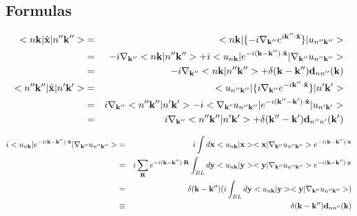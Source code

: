 \documentclass[aps,prb,preprint]{revtex4-1}
\begin{document}
\begin{appendix} \footnotesize
\section{Formulas}
%
\begin{eqnarray}
<n{\bf k}|\hat{\bf x}|n''{\bf k''}>&=& <n{\bf k}| \{ -i \nabla_{\bf k''} e^{i{\bf k'' \cdot \hat{x} }} \} |u_{n''{\bf k''}}>\nonumber \\
&=&  -i \nabla_{\bf k''} <n{\bf k}|n''{\bf k''}> + i <u_{n{\bf k}}| e^{-i{\bf (k-k'') \cdot \hat{x} }} |\nabla_{\bf k''} u_{n''{\bf k''}}>\nonumber \\
&=&  -i \nabla_{\bf k''} <n{\bf k}|n''{\bf k''}> + \delta({\bf k-k''}) {\bf d}_{nn''}({\bf k}) \\
<n''{\bf k''}|\hat{\bf x}|n'{\bf k'}>&=& <u_{n''{\bf k''}}| \{ i \nabla_{\bf k''} e^{-i{\bf k'' \cdot \hat{x} }} \} |n'{\bf k'}>\nonumber \\
&=&  i \nabla_{\bf k''} <n''{\bf k''}|n'{\bf k'}> - i <\nabla_{\bf k"} u_{n''{\bf k''}}| e^{-i{\bf (k''-k') \cdot \hat{x} }} |u_{n'{\bf k'}}>\nonumber \\
&=&  i \nabla_{\bf k''} <n''{\bf k''}|n'{\bf k'}> + \delta({\bf k''-k'}) {\bf d}_{n''n'}({\bf k'})
\end{eqnarray} 

%
\begin{eqnarray}
i <u_{n{\bf k}}| e^{-i{\bf (k-k'' )\cdot \hat{x}} }|\nabla_{\bf k''} u_{n''{\bf k''}}> &=& i \int d{\bf x} <u_{n{\bf k}}|{\bf x}> <{\bf x}|\nabla_{\bf k''} u_{n''{\bf k''}}> e^{-i{\bf (k-k'' )\cdot {x}} }\nonumber \\
&=& i \sum_{\bf R} e^{-i{\bf (k-k'' )\cdot {\bf R}} } \int_{BL} d{\bf y} <u_{n{\bf k}}|{\bf y}> <{\bf y}|\nabla_{\bf k''} u_{n''{\bf k''}}> e^{-i{\bf (k-k'' )\cdot {y}} } \nonumber \\
&=& \delta({\bf k-k''})  ( i \int_{BL} d{\bf y}  <u_{n{\bf k}}|{\bf y}> <{\bf y}|\nabla_{\bf k''} u_{n''{\bf k''}}> )\nonumber \\
&\equiv& \delta({\bf k-k''}) {\bf d}_{nn''}({\bf k})
 \end{eqnarray} 
 

\end{appendix}
\end{document}
